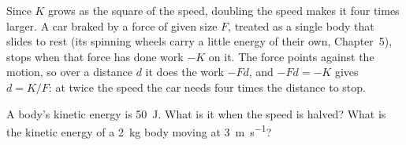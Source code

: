 Since $K$ grows as the square of the speed, doubling the speed makes it
four times larger. A car braked by a force of given size $F$, treated as a single body that
slides to rest (its spinning wheels carry a little energy of their own,
Chapter~5), stops when
that force has done work $-K$ on it. The force points against the motion,
so over a distance $d$ it does the work $-Fd$, and $-Fd = -K$ gives $d =
K/F$: at twice the speed the car needs four times the distance to stop.

\begin{selfcheck}
A body's kinetic energy is \SI{50}{\joule}. What is it when the speed is
halved? What is the kinetic energy of a \SI{2}{\kilogram} body moving at
\SI{3}{\metre\per\second}?
\end{selfcheck}

